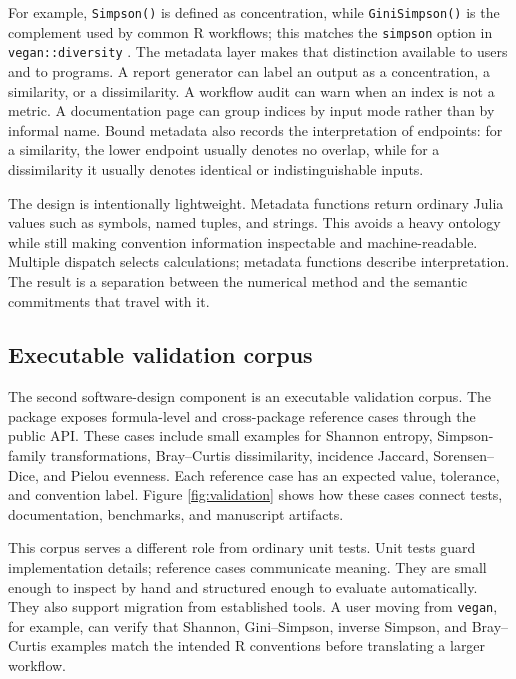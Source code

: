 \documentclass[preprint,12pt,authoryear]{elsarticle}
\begin{document}


For example, \texttt{Simpson()} is defined as concentration, while
\texttt{GiniSimpson()} is the complement used by common R workflows; this
matches the \texttt{simpson} option in \texttt{vegan::diversity}
\citep{oksanen2022vegan}.  The metadata layer makes that distinction
available to users and to programs.
A report generator can label an output as a concentration, a similarity, or a
dissimilarity.  A workflow audit can warn when an index is not a metric.  A
documentation page can group indices by input mode rather than by informal
name.  Bound metadata also records the interpretation of endpoints: for a
similarity, the lower endpoint usually denotes no overlap, while for a
dissimilarity it usually denotes identical or indistinguishable inputs.

The design is intentionally lightweight.  Metadata functions return ordinary
Julia values such as symbols, named tuples, and strings.  This avoids a heavy
ontology while still making convention information inspectable and
machine-readable.  Multiple dispatch selects calculations; metadata functions
describe interpretation.  The result is a separation between the numerical
method and the semantic commitments that travel with it.

\subsection{Executable validation corpus}

The second software-design component is an executable validation corpus.
The package exposes formula-level and cross-package reference cases through
the public API.  These cases include small examples for Shannon entropy,
Simpson-family transformations, Bray--Curtis dissimilarity, incidence
Jaccard, Sorensen--Dice, and Pielou evenness.  Each reference case has an
expected value, tolerance, and convention label.  Figure \ref{fig:validation}
shows how these cases connect tests, documentation, benchmarks, and manuscript
artifacts.



This corpus serves a different role from ordinary unit tests.  Unit tests
guard implementation details; reference cases communicate meaning.  They are
small enough to inspect by hand and structured enough to evaluate
automatically.  They also support migration from established tools.  A user
moving from \texttt{vegan}, for example, can verify that Shannon, Gini--Simpson,
inverse Simpson, and Bray--Curtis examples match the intended R conventions
before translating a larger workflow.
\end{document}
